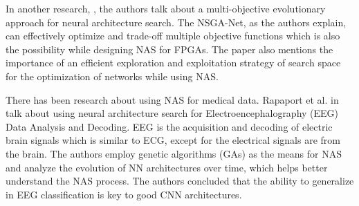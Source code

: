 In another research, \cite{lu2018nsga}, the authors talk about a multi-objective evolutionary approach for neural architecture search. The NSGA-Net, as the authors explain, can effectively optimize and trade-off multiple objective functions which is also the possibility while designing NAS for FPGAs. The paper also mentions the importance of an efficient exploration and exploitation strategy of search space for the optimization of networks while using NAS. 

There has been research about using NAS for medical data. Rapaport et al. in \cite{rapaport2019eegnas} talk about using neural architecture search for Electroencephalography (EEG) Data Analysis and Decoding. EEG is the acquisition and decoding of electric brain signals which is similar to ECG, except for the electrical signals are from the brain. The authors employ genetic algorithms (GAs) as the means for NAS and analyze the evolution of NN architectures over time, which helps better understand the NAS process. The authors concluded that the ability to generalize in EEG classiﬁcation is key to good CNN  architectures.

\afterpage{\blankpage}


